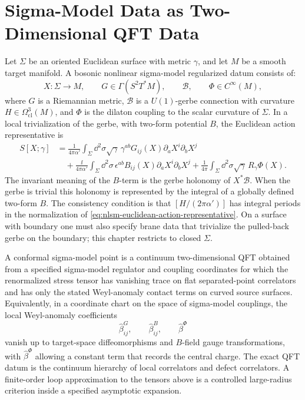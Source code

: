 \section{Sigma-Model Data as Two-Dimensional QFT Data}

Let \(\Sigma\) be an oriented Euclidean surface with metric \(\gamma\), and
let \(M\) be a smooth target manifold.  A bosonic nonlinear sigma-model
regularized datum consists of:
\[
  X:\Sigma\longrightarrow M,\qquad
  G\in\Gamma(S^2T^*M),\qquad
  \mathcal B,\qquad
  \Phi\in C^\infty(M),
\]
where \(G\) is a Riemannian metric, \(\mathcal B\) is a \(U(1)\)-gerbe
connection with curvature \(H\in\Omega^3_{\mathrm{cl}}(M)\), and \(\Phi\) is
the dilaton coupling to the scalar curvature of \(\Sigma\).  In a local
trivialization of the gerbe, with two-form potential \(B\), the Euclidean
action representative is
\begin{equation}
\begin{aligned}
  S[X;\gamma]
  &=
  \frac1{4\pi\alpha'}
  \int_\Sigma
  \dd^2\sigma\sqrt\gamma\,
  \gamma^{ab}G_{ij}(X)\partial_aX^i\partial_bX^j
  \\
  &\quad
  +
  \frac{\ii}{4\pi\alpha'}
  \int_\Sigma
  \dd^2\sigma\,
  \epsilon^{ab}B_{ij}(X)\partial_aX^i\partial_bX^j
  +
  \frac1{4\pi}
  \int_\Sigma
  \dd^2\sigma\sqrt\gamma\,R_\gamma\Phi(X).
\end{aligned}
  \label{eq:nlsm-euclidean-action-representative}
\end{equation}
The invariant meaning of the \(B\)-term is the gerbe holonomy of
\(X^*\mathcal B\).  When the gerbe is trivial this holonomy is represented by
the integral of a globally defined two-form \(B\).  The consistency condition
is that \([H/(2\pi\alpha')]\) has integral periods in the normalization of
\eqref{eq:nlsm-euclidean-action-representative}.  On a surface with boundary
one must also specify brane data that trivialize the pulled-back gerbe on the
boundary; this chapter restricts to closed \(\Sigma\).

\begin{definition}
\label{def:conformal-sigma-model-point}
A conformal sigma-model point is a continuum two-dimensional QFT obtained
from a specified sigma-model regulator and coupling coordinates for which the
renormalized stress tensor has vanishing trace on flat separated-point
correlators and has only the stated Weyl-anomaly contact terms on curved
source surfaces.  Equivalently, in a coordinate chart on the space of sigma-model
couplings, the local Weyl-anomaly coefficients
\[
  \widehat\beta^G_{ij},\qquad
  \widehat\beta^B_{ij},\qquad
  \widehat\beta^\Phi
\]
vanish up to target-space diffeomorphisms and \(B\)-field gauge
transformations, with \(\widehat\beta^\Phi\) allowing a constant term that
records the central charge.  The exact QFT datum is the continuum hierarchy
of local correlators and defect correlators.  A finite-order loop
approximation to the tensors above is a controlled large-radius criterion
inside a specified asymptotic expansion.
\end{definition}

